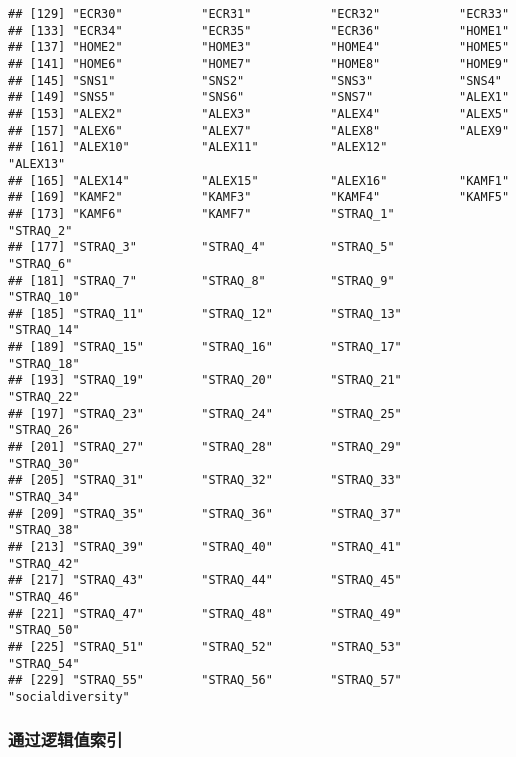 \documentclass[
]{article}
\newenvironment{Shaded}{\begin{snugshade}}{\end{snugshade}}
\newcommand{\DecValTok}[1]{\textcolor[rgb]{0.00,0.00,0.81}{#1}}
\newcommand{\NormalTok}[1]{#1}
\newcommand{\SpecialCharTok}[1]{\textcolor[rgb]{0.81,0.36,0.00}{\textbf{#1}}}
\begin{document}
\begin{verbatim}
## [129] "ECR30"           "ECR31"           "ECR32"           "ECR33"          
## [133] "ECR34"           "ECR35"           "ECR36"           "HOME1"          
## [137] "HOME2"           "HOME3"           "HOME4"           "HOME5"          
## [141] "HOME6"           "HOME7"           "HOME8"           "HOME9"          
## [145] "SNS1"            "SNS2"            "SNS3"            "SNS4"           
## [149] "SNS5"            "SNS6"            "SNS7"            "ALEX1"          
## [153] "ALEX2"           "ALEX3"           "ALEX4"           "ALEX5"          
## [157] "ALEX6"           "ALEX7"           "ALEX8"           "ALEX9"          
## [161] "ALEX10"          "ALEX11"          "ALEX12"          "ALEX13"         
## [165] "ALEX14"          "ALEX15"          "ALEX16"          "KAMF1"          
## [169] "KAMF2"           "KAMF3"           "KAMF4"           "KAMF5"          
## [173] "KAMF6"           "KAMF7"           "STRAQ_1"         "STRAQ_2"        
## [177] "STRAQ_3"         "STRAQ_4"         "STRAQ_5"         "STRAQ_6"        
## [181] "STRAQ_7"         "STRAQ_8"         "STRAQ_9"         "STRAQ_10"       
## [185] "STRAQ_11"        "STRAQ_12"        "STRAQ_13"        "STRAQ_14"       
## [189] "STRAQ_15"        "STRAQ_16"        "STRAQ_17"        "STRAQ_18"       
## [193] "STRAQ_19"        "STRAQ_20"        "STRAQ_21"        "STRAQ_22"       
## [197] "STRAQ_23"        "STRAQ_24"        "STRAQ_25"        "STRAQ_26"       
## [201] "STRAQ_27"        "STRAQ_28"        "STRAQ_29"        "STRAQ_30"       
## [205] "STRAQ_31"        "STRAQ_32"        "STRAQ_33"        "STRAQ_34"       
## [209] "STRAQ_35"        "STRAQ_36"        "STRAQ_37"        "STRAQ_38"       
## [213] "STRAQ_39"        "STRAQ_40"        "STRAQ_41"        "STRAQ_42"       
## [217] "STRAQ_43"        "STRAQ_44"        "STRAQ_45"        "STRAQ_46"       
## [221] "STRAQ_47"        "STRAQ_48"        "STRAQ_49"        "STRAQ_50"       
## [225] "STRAQ_51"        "STRAQ_52"        "STRAQ_53"        "STRAQ_54"       
## [229] "STRAQ_55"        "STRAQ_56"        "STRAQ_57"        "socialdiversity"
\end{verbatim}

\subsubsection{通过逻辑值索引}\label{ux901aux8fc7ux903bux8f91ux503cux7d22ux5f15}

\begin{Shaded}
\end{Shaded}
\end{document}
